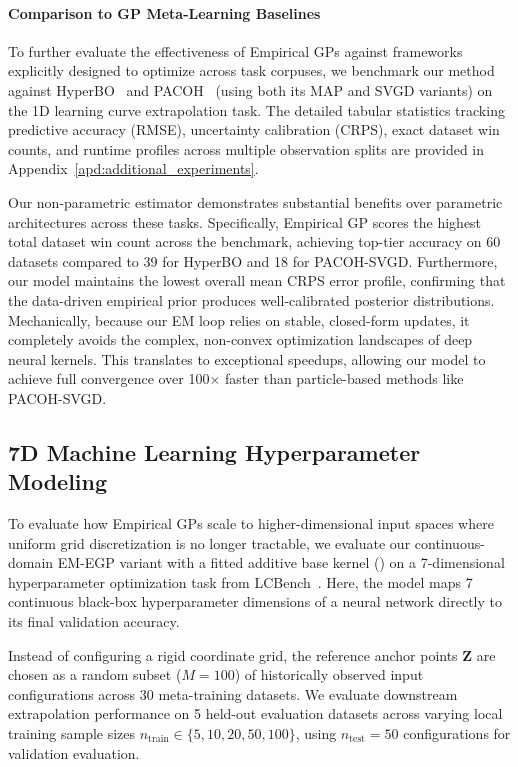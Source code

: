 \documentclass{article}
\begin{document}
\paragraph{Comparison to GP Meta-Learning Baselines}

To further evaluate the effectiveness of Empirical GPs against frameworks explicitly designed to optimize across task corpuses, we benchmark our method against HyperBO~\citep{wang2024hyperbo} and PACOH~\citep{rothfuss2021pacoh} (using both its MAP and SVGD variants) on the 1D learning curve extrapolation task. The detailed tabular statistics tracking predictive accuracy (RMSE), uncertainty calibration (CRPS), exact dataset win counts, and runtime profiles across multiple observation splits are provided in Appendix~\ref{apd:additional_experiments}.

Our non-parametric estimator demonstrates substantial benefits over parametric architectures across these tasks. Specifically, Empirical GP scores the highest total dataset win count across the benchmark, achieving top-tier accuracy on 60 datasets compared to 39 for HyperBO and 18 for PACOH-SVGD. Furthermore, our model maintains the lowest overall mean CRPS error profile, confirming that the data-driven empirical prior produces well-calibrated posterior distributions. Mechanically, because our EM loop relies on stable, closed-form updates, it completely avoids the complex, non-convex optimization landscapes of deep neural kernels. This translates to exceptional speedups, allowing our model to achieve full convergence over 100$\times$ faster than particle-based methods like PACOH-SVGD.

\subsection{7D Machine Learning Hyperparameter Modeling}
\label{sec:higher_dim_experiments}

To evaluate how Empirical GPs scale to higher-dimensional input spaces where uniform grid discretization is no longer tractable, we evaluate our continuous-domain EM-EGP variant with a fitted additive base kernel () on a 7-dimensional hyperparameter optimization task from LCBench~\citep{zimmer2021auto}. Here, the model maps 7 continuous black-box hyperparameter dimensions of a neural network directly to its final validation accuracy.

Instead of configuring a rigid coordinate grid, the reference anchor points $\mathbf{Z}$ are chosen as a random subset ($M = 100$) of historically observed input configurations across 30 meta-training datasets. We evaluate downstream extrapolation performance on 5 held-out evaluation datasets across varying local training sample sizes $n_{\text{train}} \in \{5, 10, 20, 50, 100\}$, using $n_{\text{test}} = 50$ configurations for validation evaluation.
\end{document}

